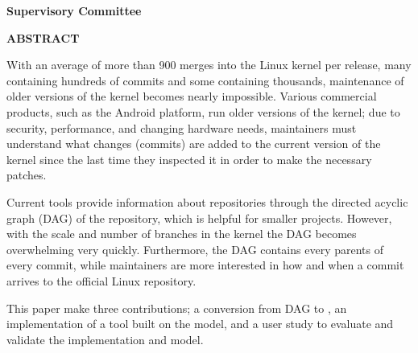 \newpage
{}

\noindent \textbf{Supervisory Committee}
\tpbreak
\panel

\begin{center}
  \textbf{ABSTRACT}

  With an average of more than 900 merges into the Linux kernel per
  release, many containing hundreds of commits and some containing
  thousands, maintenance of older versions of the kernel becomes nearly
  impossible. Various commercial products, such as the Android platform,
  run older versions of the kernel; due to security, performance, and
  changing hardware needs, maintainers must understand what changes
  (commits) are added to the current version of the kernel since the last
  time they inspected it in order to make the necessary patches.

  Current tools provide information about repositories through the
  directed acyclic graph (DAG) of the repository, which is helpful for
  smaller projects. However, with the scale and number of branches in the
  kernel the DAG becomes overwhelming very quickly. Furthermore, the DAG
  contains every parents of every commit, while maintainers are more
  interested in how and when a commit arrives to the official Linux
  repository.

  This paper make three contributions; a conversion from DAG to \mt, an
  implementation of a tool built on the \mt model, and a user study to
  evaluate and validate the implementation and model.
\end{center}

